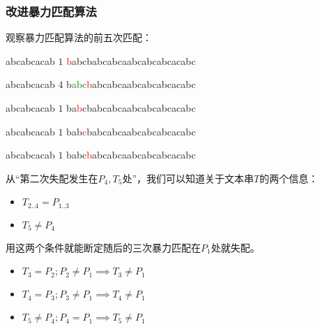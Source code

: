 \documentclass{ctexbeamer}
\newcommand{\red}[1]{\textcolor{red}{#1}}
\newcommand{\green}[1]{\textcolor{green}{#1}}
\begin{document}
\begin{frame}[fragile]
\frametitle{改进暴力匹配算法}

观察暴力匹配算法的前五次匹配：

	\begin{tverb}[frame=bottomline, fontsize=\small]
abcabcacab \(1\)
\red{b}abcbabcabcaabcabcabcacabc
	\end{tverb}

\begin{tverb}[frame=bottomline, fontsize=\small]
 abcabcacab \(4\)
b\green{abc}\red{b}abcabcaabcabcabcacabc
	\end{tverb}


	\begin{tverb}[frame=bottomline, fontsize=\small]
  abcabcacab \(1\)
ba\red{b}cbabcabcaabcabcabcacabc
	\end{tverb}

	\begin{tverb}[frame=bottomline, fontsize=\small]
   abcabcacab \(1\)
bab\red{c}babcabcaabcabcabcacabc
	\end{tverb}

	\begin{tverb}[frame=bottomline, fontsize=\small]
    abcabcacab \(1\)
babc\red{b}abcabcaabcabcabcacabc
	\end{tverb}

从``第二次失配发生在$P_4, T_5$处''，我们可以知道关于文本串$T$的两个信息：
\begin{itemize}
\item $T_{2..4} = P_{1..3}$
\item $T_5 \ne P_4$
\end{itemize}
用这两个条件就能断定随后的三次暴力匹配在$P_1$处就失配。 
\begin{itemize}
  \item $T_3 = P_2; P_2 \ne P_1 \implies T_3 \ne P_1$
  \item $T_4 = P_3; P_3 \ne P_1 \implies T_4 \ne P_1$
  \item $T_5 \ne P_4; P_4 = P_1 \implies T_5 \ne P_1$
\end{itemize}

\end{frame}
\end{document}
